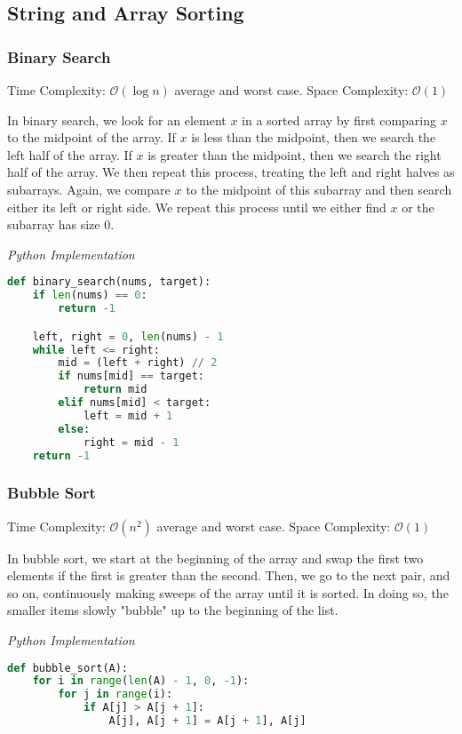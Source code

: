 \documentclass{article}
\newcommand{\bigO}{\mathcal{O}}
\begin{document}
    \subsection{String and Array Sorting}
    \subsubsection{Binary Search}
    Time Complexity: $\bigO(\log n)$ average and worst case.  Space Complexity: $\bigO(1)$
    
    In binary search, we look for an element $x$ in a sorted array by first comparing $x$ to the midpoint of the array. If $x$ is less than the midpoint, then we search the left half of the array. If $x$ is greater than the midpoint, then we search the right half of the array. We then repeat this process, treating the left and right halves as subarrays. Again, we compare $x$ to the midpoint of this subarray and then search either its left or right side. We repeat this process until we either find $x$ or the subarray has size 0.

\vspace{8pt} \emph{Python Implementation}
\begin{lstlisting}[language=Python]
def binary_search(nums, target):
    if len(nums) == 0:
        return -1

    left, right = 0, len(nums) - 1
    while left <= right:
        mid = (left + right) // 2
        if nums[mid] == target:
            return mid
        elif nums[mid] < target:
            left = mid + 1
        else:
            right = mid - 1
    return -1
\end{lstlisting}
    
    \subsubsection{Bubble Sort}
    Time Complexity: $\bigO(n^2)$ average and worst case. Space Complexity: $\bigO(1)$
     
    In bubble sort, we start at the beginning of the array and swap the first two elements if the first is greater than the second. Then, we go to the next pair, and so on, continuously making sweeps of the array until it is
    sorted. In doing so, the smaller items slowly "bubble" up to the beginning of the list. 

\vspace{8pt} \emph{Python Implementation}
\begin{lstlisting}[language=Python]
def bubble_sort(A):
    for i in range(len(A) - 1, 0, -1):
        for j in range(i):
            if A[j] > A[j + 1]:
                A[j], A[j + 1] = A[j + 1], A[j]
\end{lstlisting}
\end{document}
